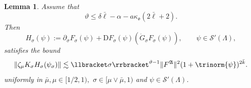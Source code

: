 \documentclass{article}
\numberwithin{equation}{section}
\newcommand{\assign}{:=}
\newcommand{\mathD}{\mathrm{D}}
\theoremstyle{plain}
\newtheorem{lemma}[theorem]{Lemma}
\theoremstyle{definition}
\begin{document}
\begin{lemma}
  \label{lem:packaging}Assume that
  \begin{equation}
    \vartheta \leqslant \delta \bar{\ell} - \alpha - a \kappa_{\mathfrak{o}}
    (2 \bar{\ell} + 2) . \label{eq:choice-of-K-and-l}
  \end{equation}
  Then
  \[ H_{\sigma} (\psi) \assign \partial_{\sigma} F_{\sigma} (\psi) + \mathD
     F_{\sigma} (\psi)  (\dot{G}_{\sigma} F_{\sigma} (\psi)), \qquad \psi \in
     \mathcal{S}' (\Lambda), \]
  satisfies the bound
  \[ \| \zeta_{\mu} K_{\sigma} H_{\sigma} (\psi_{\sigma}) \| \lesssim
     \llbracket \sigma \rrbracket^{\vartheta - 1}  \| F^{\mathfrak{A}} \|^2 
     (1 + \trinorm{ \psi })^{2 \bar{k}} . \]
  uniformly in $\bar{\mu}, \mu \in [1 / 2, 1),$ $\sigma \in [\mu \vee
  \bar{\mu}, 1)$ and $\psi \in \mathcal{S}' (\Lambda)$.
\end{lemma}
\end{document}
